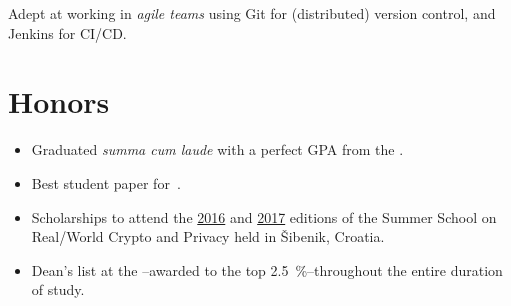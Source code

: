 \documentclass[%
version=last,%
fontsize=11pt,%
paper=A4,%
headinclude=false,%
footinclude=false,%
headlines=0,%
footlines=0,%
areasetadvanced,%
toc=bibnumbered,%
]{scrartcl}%
\begin{document}
\begin{minipage}[t]{.4\textwidth}
  \begingroup%
  \small%
  Adept at working in \emph{agile teams} using Git for (distributed) version
  control, and Jenkins for CI/CD\@.\par%
  \endgroup%

  \section{Honors}%
  \label{sec:honors}

  \begin{itemize}[leftmargin=*]
  \item Graduated \emph{summa cum laude} with a perfect GPA from the
    .
  \item Best student paper
    for~\autocite{Gjorgjevski:Combining_LWE-Solving_Algorithms}.
  \item Scholarships to attend the
    \href{http://summerschool-croatia.cs.ru.nl/2016/}{2016} and
    \href{http://summerschool-croatia.cs.ru.nl/2017/}{2017} editions of the
    Summer School on Real\-/World Crypto and Privacy held in Šibenik, Croatia.
  \item Dean’s list at the \---awarded to the top \SI{2.5}{\percent}\---throughout the
    entire duration of study.
  \end{itemize}
\end{minipage}
\end{document}
